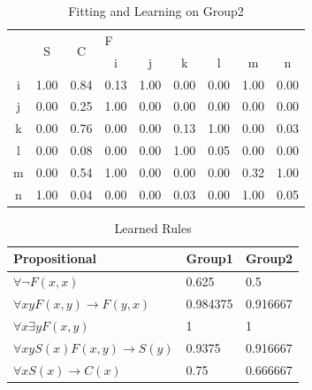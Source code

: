 \begin{table}[]
\centering
\begin{tabular}{c|c|c|cccccc}
\toprule
\multirow{2}{*}{} & \multirow{2}{*}{S} & \multirow{2}{*}{C} & \multicolumn{6}{l}{F}                   \\ \cmidrule{4-9}
                  &                    &                    & i    & j    & k    & l    & m    & n    \\ \midrule
i                 & 1.00               & 0.84               & 0.13 & 1.00 & 0.00 & 0.00 & 1.00 & 0.00 \\
j                 & 0.00               & 0.25               & 1.00 & 0.00 & 0.00 & 0.00 & 0.00 & 0.00 \\
k                 & 0.00               & 0.76               & 0.00 & 0.00 & 0.13 & 1.00 & 0.00 & 0.03 \\
l                 & 0.00               & 0.08               & 0.00 & 0.00 & 1.00 & 0.05 & 0.00 & 0.00 \\
m                 & 0.00               & 0.54               & 1.00 & 0.00 & 0.00 & 0.00 & 0.32 & 1.00 \\
n                 & 1.00               & 0.04               & 0.00 & 0.00 & 0.03 & 0.00 & 1.00 & 0.05 \\ \bottomrule
\end{tabular}
\caption{Fitting and Learning on Group2}
\label{table:learning-group-2}
\end{table}

\begin{table}[]
\centering
\begin{tabular}{lll}
\toprule
Propositional           & Group1   & Group2   \\ \midrule
$\forall \neg F(x, x)$                & 0.625    & 0.5      \\
$\forall x y F(x,y)\rightarrow F(y,x) $      & 0.984375 & 0.916667 \\
$\forall x \exists y F(x,y) $                 & 1        & 1        \\
$\forall x y S(x) F(x,y)\rightarrow S(y) $ & 0.9375   & 0.916667 \\
$\forall x S(x)\rightarrow C(x) $            & 0.75     & 0.666667 \\ \bottomrule
\end{tabular}
\caption{Learned Rules}
\label{table:learning-learned-rules}
\end{table}
